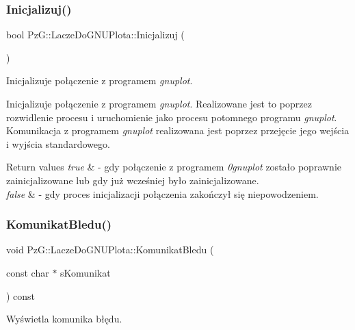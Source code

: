 \subsubsection{\texorpdfstring{Inicjalizuj()}{Inicjalizuj()}}
{\footnotesize\ttfamily bool Pz\+G\+::\+Lacze\+Do\+G\+N\+U\+Plota\+::\+Inicjalizuj (\begin{DoxyParamCaption}{ }\end{DoxyParamCaption})}



Inicjalizuje połączenie z programem {\itshape gnuplot}. 

Inicjalizuje połączenie z programem {\itshape gnuplot}. Realizowane jest to poprzez rozwidlenie procesu i uruchomienie jako procesu potomnego programu {\itshape gnuplot}. Komunikacja z programem {\itshape gnuplot} realizowana jest poprzez przejęcie jego wejścia i wyjścia standardowego.


\begin{DoxyRetVals}{Return values}
{\em true} & -\/ gdy połączenie z programem {\itshape 0gnuplot} zostało poprawnie zainicjalizowane lub gdy już wcześniej było zainicjalizowane. \\
\hline
{\em false} & -\/ gdy proces inicjalizacji połączenia zakończył się niepowodzeniem. \\
\hline
\end{DoxyRetVals}
\mbox{\label{class_pz_g_1_1_lacze_do_g_n_u_plota_ae5f907633699e898710cce4351193330}} 
\subsubsection{\texorpdfstring{KomunikatBledu()}{KomunikatBledu()}}
{\footnotesize\ttfamily void Pz\+G\+::\+Lacze\+Do\+G\+N\+U\+Plota\+::\+Komunikat\+Bledu (\begin{DoxyParamCaption}\item[{const char $\ast$}]{s\+Komunikat }\end{DoxyParamCaption}) const\hspace{0.3cm}{\ttfamily [protected]}}



Wyświetla komunika błędu. 

